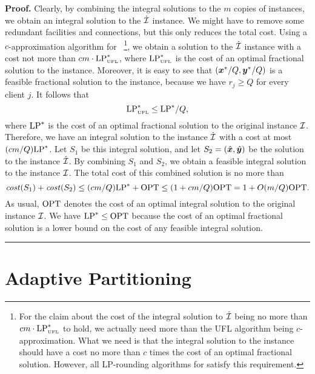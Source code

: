 \documentclass[oneside,final]{ucr}
\newenvironment{proof}[1][Proof]{\textbf{#1.} }{\ \rule{0.5em}{0.5em}}
\begin{document}
\begin{proof}
  Clearly, by combining the integral solutions to the $m$
  copies of {\UFL} instances, we obtain an integral solution
  to the $\dot {\mathcal{I}}$ instance. We might have to remove some
  redundant facilities and connections, but this only
  reduces the total cost. Using a $c$-approximation
  algorithm for {\UFL}~\footnote{For the claim about the
    cost of the integral solution to $\dot{\mathcal{I}}$ being no
    more than $cm\cdot\mbox{\rm LP}_{\mbox{\tiny\rm UFL}}^\ast$ to hold, we
    actually need more than the UFL algorithm being
    $c$-approximation. What we need is that the integral
    solution to the {\UFL} instance should have a cost no
    more than $c$ times the cost of an optimal fractional
    solution. However, all LP-rounding algorithms for {\UFL}
    satisfy this requirement.}, we obtain a solution to the
  $\dot {\mathcal{I}}$ instance with a cost not more than $c m \cdot
  \mbox{\rm LP}_{\mbox{\tiny\rm UFL}}^\ast$, where $\mbox{\rm LP}_{\mbox{\tiny\rm UFL}}^\ast$ is the
  cost of an optimal fractional solution to the {\UFL}
  instance. Moreover, it is easy to see that
  $(\boldsymbol{x}^\ast/Q,\boldsymbol{y}^\ast/Q)$ is a feasible fractional
  solution to the {\UFL} instance, because we have $r_j \geq
  Q$ for every client $j$. It follows that
  \begin{equation*}
    \mbox{\rm LP}_{\mbox{\tiny\rm UFL}}^\ast \leq \mbox{\rm LP}^\ast / Q,
  \end{equation*}
  where $\mbox{\rm LP}^\ast$ is the cost of an optimal fractional
  solution to the original {\FTFP} instance
  $\mathcal{I}$. Therefore, we have an integral solution to the
  instance $\dot{\mathcal{I}}$ with a cost at most $(cm/Q)
  \mbox{\rm LP}^\ast$. Let $S_1$ be this integral solution, and let
  $S_2 = (\hat{\boldsymbol{x}},\hat{\boldsymbol{y}})$ be the solution to the
  instance $\hat{\mathcal{I}}$. By combining $S_1$ and $S_2$, we
  obtain a feasible integral solution to the instance
  $\mathcal{I}$.  The total cost of this combined solution is no
  more than
  \begin{equation*}
    {\it cost}(S_1) + {\it cost}(S_2) \leq (cm/Q) \mbox{\rm LP}^\ast + \mbox{\rm OPT} \leq (1 +
    cm/Q) \mbox{\rm OPT} = 1 + O(m/Q) \mbox{\rm OPT}.
  \end{equation*}
  As usual, $\mbox{\rm OPT}$ denotes the cost of an optimal integral
  solution to the original {\FTFP} instance $\mathcal{I}$. We have
  $\mbox{\rm LP}^\ast \leq \mbox{\rm OPT}$ because the cost of an optimal
  fractional solution is a lower bound on the cost of any
  feasible integral solution.
\end{proof}


\section{Adaptive Partitioning}
\label{sec: adaptive partitioning}
\end{document}
